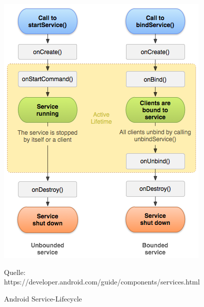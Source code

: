 \begin{figure}[h]
\centering
\includegraphics[width=0.8\linewidth]{content/images/Android-ServiceLifecycle}
\caption{Android Service-Lifecycle}
Quelle: https://developer.android.com/guide/components/services.html
\label{pic:androidServiceLifecycle}
\end{figure}


